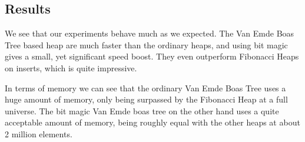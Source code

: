 \subsection{Results}

We see that our experiments behave much as we expected. The Van Emde Boas Tree  based heap are much faster than the ordinary heaps, and using bit magic gives a small, yet significant speed boost. They even outperform Fibonacci Heaps on inserts, which is quite impressive.

In terms of memory we can see that the ordinary Van Emde Boas Tree uses a huge amount of memory, only being surpassed by the Fibonacci Heap at a full universe. The bit magic Van Emde boas tree on the other hand uses a quite acceptable amount of memory, being roughly equal with the other heaps at about 2 million elements.